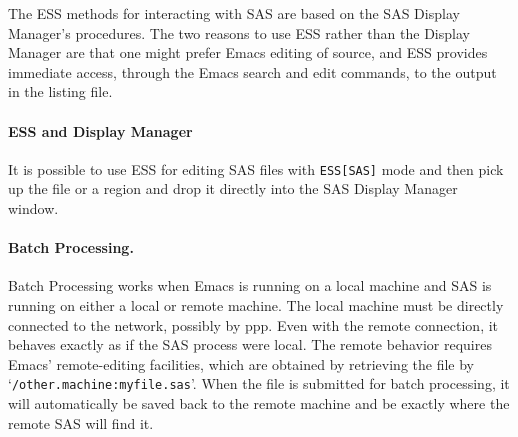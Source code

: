 \documentclass{article}
\newcommand{\stexttt}[1]{{\small\texttt{#1}}}
\newcommand{\ssf}[1]{{\small\sf{#1}}}
\newcommand{\file}[1]{`\stexttt{#1}'}
\begin{document}
The ESS methods for interacting with SAS are based on the SAS Display
Manager's procedures.  The two reasons to use ESS rather than the
Display Manager are that one might prefer Emacs editing of source, and
ESS provides immediate access, through the Emacs search and edit
commands, to the output in the listing file.
 
\paragraph{ESS and Display Manager}
It is possible to use ESS for editing SAS files with \stexttt{ESS[SAS]} mode
and then pick up the file or a region and drop it directly into the SAS
Display Manager \ssf{Program Editor} window.

\paragraph{Batch Processing.}
Batch Processing works when Emacs is running on a local machine and
SAS is running on either a local or remote machine.  The local machine
must be directly connected to the network, possibly by ppp.  Even with
the remote connection, it behaves exactly as if the SAS process were
local.  The remote behavior requires Emacs' remote-editing facilities,
which are obtained by retrieving the file by
\file{/other.machine:myfile.sas}.  When the file is submitted for
batch processing, it will automatically be saved back to the remote
machine and be exactly where the remote SAS will find it.


\end{document}
